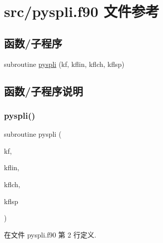\hypertarget{pyspli_8f90}{}\section{src/pyspli.f90 文件参考}
\label{pyspli_8f90}
\subsection*{函数/子程序}
\begin{DoxyCompactItemize}
\item 
subroutine \mbox{\hyperlink{pyspli_8f90_a4ae9e84695eaec96205a586a9cbd2b11}{pyspli}} (kf, kflin, kflch, kflsp)
\end{DoxyCompactItemize}


\subsection{函数/子程序说明}
\mbox{\label{pyspli_8f90_a4ae9e84695eaec96205a586a9cbd2b11}} 
\subsubsection{\texorpdfstring{pyspli()}{pyspli()}}
{\footnotesize\ttfamily subroutine pyspli (\begin{DoxyParamCaption}\item[{}]{kf,  }\item[{}]{kflin,  }\item[{}]{kflch,  }\item[{}]{kflsp }\end{DoxyParamCaption})}



在文件 pyspli.\+f90 第 2 行定义.

